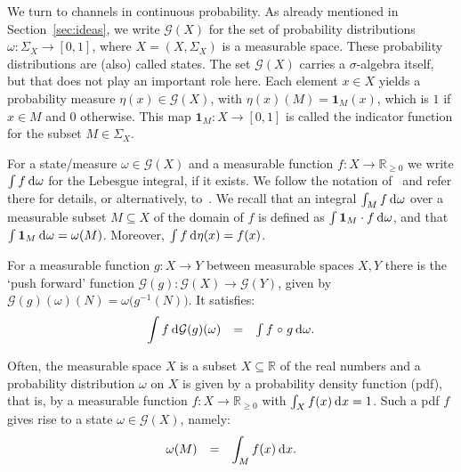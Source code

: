 \documentclass{mscs}
\newcommand{\after}{\mathrel{\circ}}
\newcommand{\Giry}{\mathcal{G}}
\newcommand{\R}{\mathbb{R}}
\newcommand{\intd}{{\kern.2em}\mathrm{d}{\kern.03em}}
\newcommand{\indic}[1]{\mathbf{1}_{#1}}
\begin{document}
\medskip

We turn to channels in continuous probability. As already mentioned in
Section~\ref{sec:ideas}, we write $\Giry(X)$ for the set of
probability distributions $\omega\colon \Sigma_{X} \rightarrow [0,1]$,
where $X = (X,\Sigma_{X})$ is a measurable space. These probability
distributions are (also) called states.  The set $\Giry(X)$ carries a
$\sigma$-algebra itself, but that does not play an important role
here. Each element $x\in X$ yields a probability measure
$\eta(x)\in\Giry(X)$, with $\eta(x)(M) = \indic{M}(x)$, which is $1$
if $x\in M$ and $0$ otherwise. This map $\indic{M} \colon X
\rightarrow [0,1]$ is called the indicator function for the subset
$M\in\Sigma_{X}$.

For a state/measure $\omega\in\Giry(X)$ and a measurable function
$f\colon X \rightarrow \R_{\geq 0}$ we write $\int f\intd \omega$ for
the Lebesgue integral, if it exists. We follow the notation
of~\cite{Jacobs13a} and refer there for details, or alternatively,
to~\cite{Panangaden09}. We recall that an integral $\int_{M} f\intd
\omega$ over a measurable subset $M\subseteq X$ of the domain of $f$
is defined as $\int \indic{M}\cdot f \intd\omega$, and that $\int
\indic{M} \intd\omega = \omega(M)$. Moreover, $\int f \intd\eta(x) =
f(x)$.

For a measurable function $g\colon X\rightarrow Y$ between measurable
spaces $X,Y$ there is the `push forward' function $\Giry(g) \colon
\Giry(X) \rightarrow \Giry(Y)$, given by $\Giry(g)(\omega)(N) =
\omega\big(g^{-1}(N)\big)$. It satisfies:
\begin{equation}
\label{eqn:invmeasure}
\begin{array}{rcl}
\displaystyle\int f \intd \Giry(g)(\omega)
& = &
\int f \after g \intd \omega.
\end{array}
\end{equation}

\noindent Often, the measurable space $X$ is a subset $X\subseteq\R$
of the real numbers and a probability distribution $\omega$ on $X$ is
given by a probability density function (pdf), that is, by a
measurable function $f\colon X \rightarrow \R_{\geq 0}$ with $\int_{X}
f(x) \intd x = 1$. Such a pdf $f$ gives rise to a state $\omega
\in\Giry(X)$, namely:
\begin{equation}
\label{eqn:statefrompdf}
\begin{array}{rcl}
\omega(M)
& = &
\displaystyle \int_{M} f(x) \intd x.
\end{array}
\end{equation}
\end{document}
